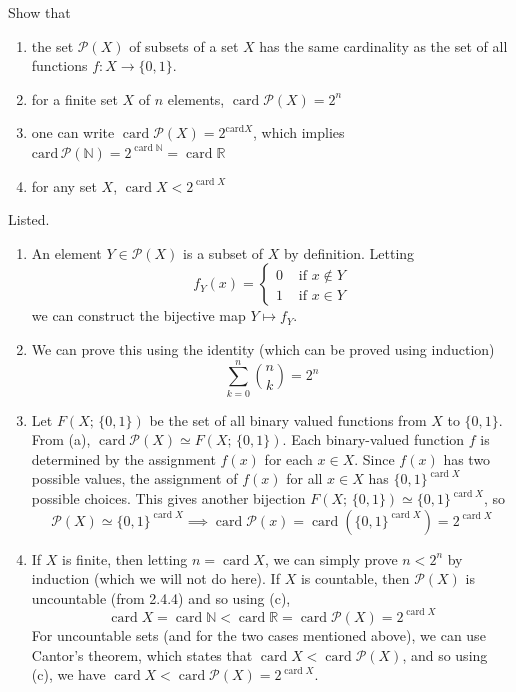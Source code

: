 \documentclass{article}
\DeclareMathOperator{\card}{card}
\begin{document}
    \begin{exercise}[Zorich 2.4.5]
    Show that 
    \begin{enumerate}
        \item the set $\mathcal{P}(X)$ of subsets of a set $X$ has the same cardinality as the set of all functions $f: X \longrightarrow \{0, 1\}$. 
        \item for a finite set $X$ of $n$ elements, $\card{\mathcal{P}(X)} = 2^n$ 
        \item one can write $\card{\mathcal{P}(X)} = 2^{\text{card}{X}}$, which implies $\text{card}\, \mathcal{P}(\mathbb{N}) = 2^{\card \mathbb{N}} = \card \mathbb{R}$ 
        \item for any set $X$, $\card{X} < 2^{\card{X}}$
    \end{enumerate}
    \end{exercise}

    \begin{solution}
    Listed. 
    \begin{enumerate}
        \item An element $Y \in \mathcal{P}(X)$ is a subset of $X$ by definition. Letting 
        \[f_Y (x) = \begin{cases} 0 & \text{ if } x \not\in Y \\
        1 & \text{ if } x \in Y \end{cases}\]
        we can construct the bijective map $Y \mapsto f_Y$. 
        \item We can prove this using the identity (which can be proved using induction) 
          \[\sum_{k=0}^n \binom{n}{k} = 2^n \]
        \item Let $F(X; \, \{0, 1\})$ be the set of all binary valued functions from $X$ to $\{0, 1\}$. From (a), $\card{\mathcal{P}(X)} \simeq F(X; \, \{0, 1\})$. Each binary-valued function $f$ is determined by the assignment $f(x)$ for each $x \in X$. Since $f(x)$ has two possible values, the assignment of $f(x)$ for all $x \in X$ has $\{0, 1\}^{\card{X}}$ possible choices. This gives another bijection $F(X; \, \{0, 1\}) \simeq \{0, 1\}^{\card{X}}$, so 
        \[\mathcal{P}(X) \simeq \{0, 1\}^{\card{X}} \implies \card{\mathcal{P}(x)} = \card(\{0, 1\}^{\card{X}}) = 2^{\card{X}} \]
        \item If $X$ is finite, then letting $n = \card{X}$, we can simply prove $n < 2^n$ by induction (which we will not do here). If $X$ is countable, then $\mathcal{P}(X)$ is uncountable (from 2.4.4) and so using (c), 
        \[\card{X} = \card{\mathbb{N}} < \card{\mathbb{R}} = \card{\mathcal{P}(X)} = 2^{\card{X}}\]
        For uncountable sets (and for the two cases mentioned above), we can use Cantor's theorem, which states that $\card{X} < \card{\mathcal{P}(X)}$, and so using (c), we have $\card{X} < \card{\mathcal{P}(X)} = 2^{\card{X}}$. 
    \end{enumerate}
    \end{solution}
\end{document}
